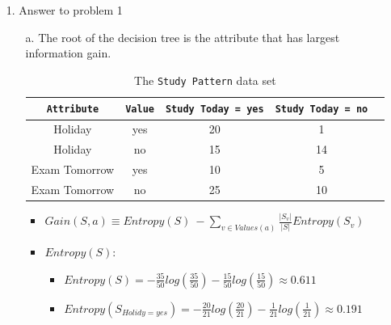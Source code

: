 
\usepackage{amsmath}
\usepackage{algorithm}%
\usepackage{algpseudocode}%
\usepackage{graphicx}
\usepackage{listings}
\graphicspath{ {.} }

\DeclareMathOperator{\proj}{proj}
\newcommand{\vctproj}[2][]{\proj_{\vec{#1}}\vec{#2}}

\oddsidemargin 0in
\evensidemargin 0in
\textwidth 6.5in
\topmargin -0.5in
\textheight 9.0in




\pagestyle{myheadings}  %

\begin{enumerate}
\item[1.] Answer to problem 1
	\begin{enumerate}
	\item[a.] The root of the decision tree is the attribute that has largest information gain.\\
		\begin{table}[h]
			\centering
			\begin{tabular}[h]{|c|c|c|c|c|}
				\hline
				\texttt{Attribute} & \texttt{Value} & \texttt{Study Today = yes} & \texttt{Study Today = no} \\
				\hline
				Holiday      & yes      & 20   & 1       \\
				Holiday      & no      & 15   & 14        \\
				Exam Tomorrow      & yes      & 10       & 5        \\
				Exam Tomorrow      & no      & 25       & 10        \\
				\hline
			\end{tabular}
			\caption{The {\tt Study Pattern} data set}
			\label{tab:Balloons}
		\end{table}
		\begin{itemize}
		\item $Gain(S,a) \equiv Entropy(S)\ - \sum_{v \in Values(a)} \frac{|S_{v}|}{|S|}
Entropy(S_{v})$
		\item $Entropy(S)$:
			\begin{itemize}
			\item $Entropy(S) = -\frac{35}{50} log(\frac{35}{50}) -\frac{15}{50} log(\frac{15}{50}) \approx 0.611$
			\item $Entropy(S_{Holidy=yes}) = -\frac{20}{21} log(\frac{20}{21}) -\frac{1}{21} log(\frac{1}{21})\approx 0.191$

\end{itemize}
\end{itemize}
\end{enumerate}
\end{enumerate}
